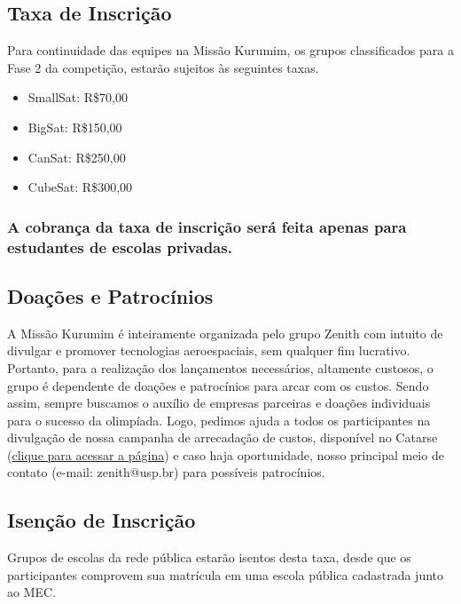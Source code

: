     \subsection{Taxa de Inscrição}\label{sec: taxa}

        \par Para continuidade das equipes na Missão Kurumim, os grupos classificados 
        para a Fase 2 da competição, estarão sujeitos às seguintes taxas.

        \begin{itemize}
            \item SmallSat: R\$70,00
            \item BigSat: R\$150,00
            \item CanSat: R\$250,00
            \item CubeSat: R\$300,00
        \end{itemize}

        \subsubsection{A cobrança da taxa de inscrição será feita apenas para estudantes 
        de escolas privadas.}\label{sec:taxa_privada}

    \subsection{Doações e Patrocínios}\label{sec:doacoes}
        \par A Missão Kurumim é inteiramente organizada pelo grupo Zenith com intuito de 
        divulgar e promover tecnologias aeroespaciais, sem qualquer fim lucrativo. Portanto,
        para a realização dos lançamentos necessários, altamente custosos, o grupo é dependente
        de doações e patrocínios para arcar com os custos. Sendo assim, sempre buscamos o auxílio 
        de empresas parceiras e doações individuais para o sucesso da olimpíada. Logo, pedimos ajuda 
        a todos os participantes na divulgação de nossa campanha de arrecadação de custos, disponível 
        no Catarse (\href{https://www.catarse.me/missao_kurumim_2025?ref=project_link}{clique para acessar a página}) e caso haja oportunidade, nosso principal meio de 
        contato (e-mail: zenith@usp.br) para possíveis patrocínios.

    \subsection{Isenção de Inscrição}\label{sec:isencao}
        \par Grupos de escolas da rede pública estarão isentos desta taxa, desde que os participantes 
        comprovem sua matrícula em uma escola pública cadastrada junto ao MEC.

